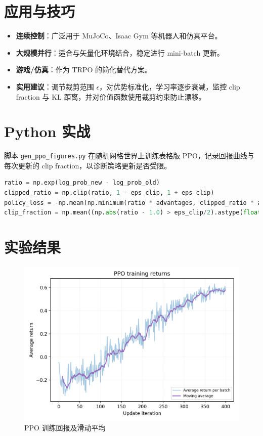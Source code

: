 \documentclass[UTF8,zihao=-4]{ctexart}
\begin{document}
\section{应用与技巧}
\begin{itemize}
  \item \textbf{连续控制}：广泛用于 MuJoCo、Isaac Gym 等机器人和仿真平台。
  \item \textbf{大规模并行}：适合与矢量化环境结合，稳定进行 mini-batch 更新。
  \item \textbf{游戏/仿真}：作为 TRPO 的简化替代方案。
  \item \textbf{实用建议}：调节裁剪范围 \(\epsilon\)，对优势标准化，学习率逐步衰减，监控 clip fraction 与 KL 距离，并对价值函数使用裁剪约束防止漂移。
\end{itemize}

\section{Python 实战}
脚本 \texttt{gen\_ppo\_figures.py} 在随机网格世界上训练表格版 PPO，记录回报曲线与每次更新的 clip fraction，以诊断策略更新是否受限。
\begin{lstlisting}[language=Python,caption={脚本 gen_ppo_figures.py 片段}]
ratio = np.exp(log_prob_new - log_prob_old)
clipped_ratio = np.clip(ratio, 1 - eps_clip, 1 + eps_clip)
policy_loss = -np.mean(np.minimum(ratio * advantages, clipped_ratio * advantages))
clip_fraction = np.mean((np.abs(ratio - 1.0) > eps_clip/2).astype(float))
\end{lstlisting}

\section{实验结果}
\begin{figure}[H]
  \centering
  \includegraphics[width=0.8\linewidth]{ppo_returns.png}
  \caption{PPO 训练回报及滑动平均}
  \label{fig:ppo_returns_cn}
\end{figure}
\end{document}
